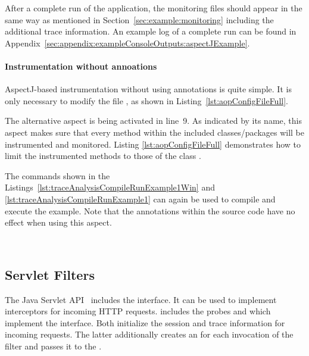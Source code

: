 \setBashListing



\noindent After a complete run of the application, the monitoring files should appear in %
the same way as mentioned in Section~\ref{sec:example:monitoring} including the %
additional trace information. An example log of a complete run can be found in %
Appendix~\ref{sec:appendix:exampleConsoleOutputs:aspectJExample}.

\paragraph*{Instrumentation without annoations}%

AspectJ-based instrumentation without using annotations is quite simple. It is %
only necessary to modify the file \file{\aopConfigFile{}}, as shown %
in Listing~\ref{lst:aopConfigFileFull}.

\setXMLListing


\noindent The alternative aspect  is being %
activated in line~9. As indicated by its name, this aspect makes sure that every %
method within the included classes/packages will be instrumented and monitored. %
Listing \ref{lst:aopConfigFileFull} demonstrates how to limit the %
instrumented methods to those of the class .

The commands shown in the Listings~\ref{lst:traceAnalysisCompileRunExample1Win} and %
\ref{lst:traceAnalysisCompileRunExample1} can again be used to compile and execute %
the example. Note that the annotations within the source code have no effect %
when using this aspect.

\


\subsection{Servlet Filters}\label{sec:traceAnalysis:instr:servlet}

The Java Servlet API~\cite{JavaServletTechnology-WebSite} includes the %
 interface. It can be used to implement %
interceptors for incoming HTTP requests. %
\Kieker{} includes the probes %
 and %
 which implement the %
 interface. %
Both initialize the session and trace information for incoming requests. %
The latter additionally creates an  for each %
invocation of the filter and passes it to the .

